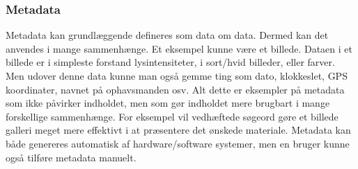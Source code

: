 \subsubsection{Metadata}
Metadata kan grundlæggende defineres som data om data. Dermed kan det anvendes i mange sammenhænge. Et eksempel kunne være et billede. Dataen i et billede er i simpleste forstand lysintensiteter, i sort/hvid billeder, eller farver. Men udover denne data kunne man også gemme ting som dato, klokkeslet, GPS koordinater, navnet på ophavsmanden osv. Alt dette er eksempler på metadata som ikke påvirker indholdet, men som gør indholdet mere brugbart i mange forskellige sammenhænge. For eksempel vil vedhæftede søgeord gøre et billede galleri meget mere effektivt i at præsentere det ønskede materiale. Metadata kan både genereres automatisk af hardware/software systemer, men en bruger kunne også tilføre metadata manuelt.\\ 

